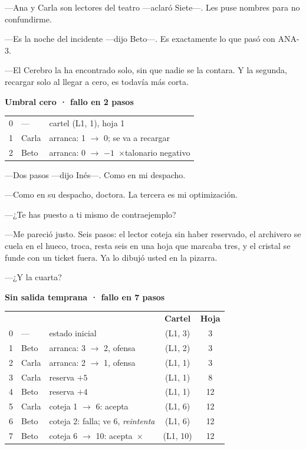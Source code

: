 ---Ana y Carla son lectores del teatro ---aclaró Siete---\nobreak. Les puse nombres para no confundirme.

---Es la noche del incidente ---dijo Beto---\nobreak. Es exactamente lo que pasó con ANA-3.

---El Cerebro la ha encontrado solo, sin que nadie se la contara. Y la segunda, recargar solo al llegar a cero, es todavía más corta.

\begin{pizarra}
\textbf{Umbral cero · fallo en 2 pasos}\\[1mm]
\begin{tabular}{@{}c l p{4.6cm}@{}}
0 & --- & cartel (L1, 1), hoja 1 \\
1 & Carla & arranca: 1 $\to$ 0; se va a recargar \\
2 & Beto & arranca: 0 $\to$ $-1$\ \textcolor{oxido}{$\boldsymbol\times$}\quad talonario negativo \\
\end{tabular}
\end{pizarra}

---Dos pasos ---dijo Inés---\nobreak. Como en mi despacho.

---Como en su despacho, doctora. La tercera es mi optimización.

---¿Te has puesto a ti mismo de contraejemplo?

---Me pareció justo. Seis pasos: el lector coteja sin haber reservado, el archivero se cuela en el hueco, troca, resta seis en una hoja que marcaba tres, y el cristal se funde con un ticket fuera. Ya lo dibujó usted en la pizarra.

---¿Y la cuarta?

\begin{pizarra}
\textbf{Sin salida temprana · fallo en 7 pasos}\\[1mm]
\begin{tabular}{@{}c l p{3.3cm} c c@{}}
& & & \textbf{Cartel} & \textbf{Hoja} \\
0 & --- & estado inicial & (L1, 3) & 3 \\
1 & Beto & arranca: 3 $\to$ 2, ofensa & (L1, 2) & 3 \\
2 & Carla & arranca: 2 $\to$ 1, ofensa & (L1, 1) & 3 \\
3 & Carla & reserva $+5$ & (L1, 1) & 8 \\
4 & Beto & reserva $+4$ & (L1, 1) & 12 \\
5 & Carla & coteja 1 $\to$ 6: acepta & (L1, 6) & 12 \\
6 & Beto & coteja 2: falla; ve 6, \emph{reintenta} & (L1, 6) & 12 \\
7 & Beto & coteja 6 $\to$ 10: acepta\ \textcolor{oxido}{$\boldsymbol\times$} & (L1, 10) & 12 \\
\end{tabular}
\end{pizarra}

